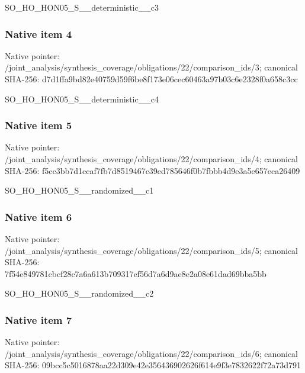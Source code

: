 \documentclass[10pt,a4paper]{article}
\begin{document}
\begingroup\raggedright\sloppy SO\_\allowbreak{}HO\_\allowbreak{}HON05\_\allowbreak{}S\_\allowbreak{}\_\allowbreak{}deterministic\_\allowbreak{}\_\allowbreak{}c3\par\endgroup

\subsubsection{Native item 4}
Native pointer: /joint\_\allowbreak{}analysis/synthesis\_\allowbreak{}coverage/obligations/22/comparison\_\allowbreak{}ids/3; canonical SHA-256: d7d1ffa9bd82e40759d59f6be8f173e06cec60463a97b03c6e2328f0a658c3cc

\begingroup\raggedright\sloppy SO\_\allowbreak{}HO\_\allowbreak{}HON05\_\allowbreak{}S\_\allowbreak{}\_\allowbreak{}deterministic\_\allowbreak{}\_\allowbreak{}c4\par\endgroup

\subsubsection{Native item 5}
Native pointer: /joint\_\allowbreak{}analysis/synthesis\_\allowbreak{}coverage/obligations/22/comparison\_\allowbreak{}ids/4; canonical SHA-256: f5cc3bb7d1ccaf7fb7d8519467c39ed785646f0b7fbbb4d9e3a5e657eca26409

\begingroup\raggedright\sloppy SO\_\allowbreak{}HO\_\allowbreak{}HON05\_\allowbreak{}S\_\allowbreak{}\_\allowbreak{}randomized\_\allowbreak{}\_\allowbreak{}c1\par\endgroup

\subsubsection{Native item 6}
Native pointer: /joint\_\allowbreak{}analysis/synthesis\_\allowbreak{}coverage/obligations/22/comparison\_\allowbreak{}ids/5; canonical SHA-256: 7f54e849781cbcf28c7a6a613b709317ef56d7a6d9ae8e2a08e61dad69bba5bb

\begingroup\raggedright\sloppy SO\_\allowbreak{}HO\_\allowbreak{}HON05\_\allowbreak{}S\_\allowbreak{}\_\allowbreak{}randomized\_\allowbreak{}\_\allowbreak{}c2\par\endgroup

\subsubsection{Native item 7}
Native pointer: /joint\_\allowbreak{}analysis/synthesis\_\allowbreak{}coverage/obligations/22/comparison\_\allowbreak{}ids/6; canonical SHA-256: 09bcc5c5016878aa22d309e42e356436902626f614e9f3e7832622f72a73d791
\end{document}
